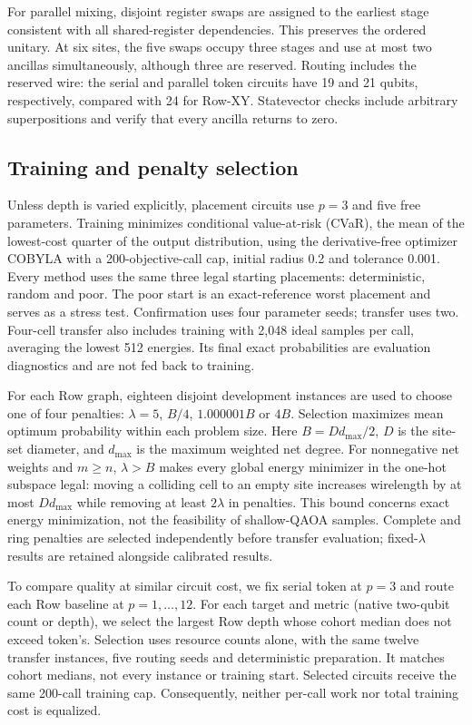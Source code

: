 \documentclass[manuscript,screen,review]{acmart}
\begin{document}
For parallel mixing, disjoint register swaps are assigned to the earliest
stage consistent with all shared-register dependencies. This preserves the
ordered unitary. At six sites, the five swaps occupy three stages and use
at most two ancillas simultaneously, although three are reserved. Routing
includes the reserved wire: the serial and parallel token circuits have
19 and 21 qubits, respectively, compared with 24 for Row-XY. Statevector
checks include arbitrary superpositions and verify that every ancilla
returns to zero.

\subsection{Training and penalty selection}
\label{sec:training}
Unless depth is varied explicitly, placement circuits use $p=3$ and five
free parameters. Training minimizes conditional value-at-risk (CVaR), the
mean of the lowest-cost quarter of the output distribution, using the derivative-free optimizer COBYLA
with a 200-objective-call cap, initial radius 0.2 and tolerance 0.001.
Every method uses the same three legal starting placements: deterministic,
random and poor. The poor start is an exact-reference worst placement and
serves as a stress test. Confirmation uses four parameter seeds; transfer
uses two. Four-cell transfer also includes training with 2,048 ideal
samples per call, averaging the lowest 512 energies. Its final exact
probabilities are evaluation diagnostics and are not fed back to training.

For each Row graph, eighteen disjoint development instances are used to
choose one of four penalties: $\lambda=5$, $B/4$, $1.000001B$ or $4B$.
Selection maximizes mean optimum probability within each problem size.
Here $B=Dd_{\max}/2$, $D$ is the
site-set diameter, and $d_{\max}$ is the maximum weighted net degree.
For nonnegative net weights and $m\ge n$, $\lambda>B$ makes every global
energy minimizer in the one-hot subspace legal: moving a colliding cell to
an empty site increases wirelength by at most $Dd_{\max}$ while removing
at least $2\lambda$ in penalties. This bound concerns exact energy
minimization, not the feasibility of shallow-QAOA samples. Complete and
ring penalties are selected independently before transfer evaluation;
fixed-$\lambda$ results are retained alongside calibrated results.

To compare quality at similar circuit cost, we fix serial token at $p=3$
and route each Row baseline at $p=1,\ldots,12$. For each target and metric
(native two-qubit count or depth), we select the largest Row depth whose
cohort median does not exceed token's. Selection uses resource counts
alone, with the same twelve transfer instances, five routing seeds and
deterministic preparation. It matches cohort medians, not every instance
or training start. Selected circuits receive the same 200-call training
cap. Consequently, neither per-call work nor total training cost is equalized.
\end{document}
